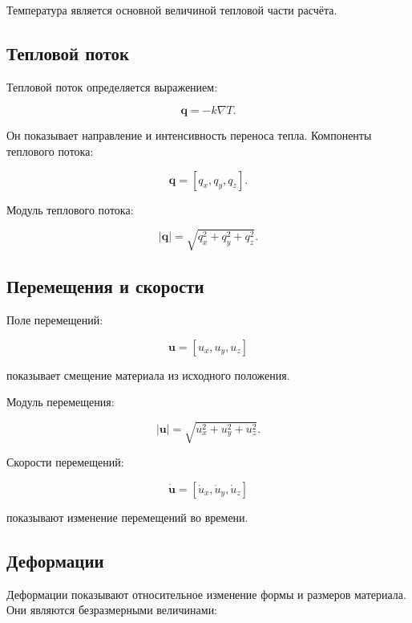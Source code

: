 Температура является основной величиной тепловой части расчёта.

\subsection{Тепловой поток}

Тепловой поток определяется выражением:

\begin{equation}
\mathbf{q}=-k\nabla T.
\end{equation}

Он показывает направление и интенсивность переноса тепла. Компоненты теплового потока:

\begin{equation}
\mathbf{q}=[q_x,q_y,q_z].
\end{equation}

Модуль теплового потока:

\begin{equation}
|\mathbf{q}|=\sqrt{q_x^2+q_y^2+q_z^2}.
\end{equation}

\subsection{Перемещения и скорости}

Поле перемещений:

\begin{equation}
\mathbf{u}=[u_x,u_y,u_z]
\end{equation}

показывает смещение материала из исходного положения.

Модуль перемещения:

\begin{equation}
|\mathbf{u}|=\sqrt{u_x^2+u_y^2+u_z^2}.
\end{equation}

Скорости перемещений:

\begin{equation}
\dot{\mathbf{u}}=[\dot{u}_x,\dot{u}_y,\dot{u}_z]
\end{equation}

показывают изменение перемещений во времени.

\subsection{Деформации}

Деформации показывают относительное изменение формы и размеров материала. Они являются безразмерными величинами:

